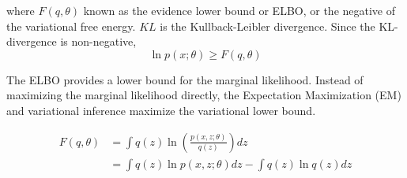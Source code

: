 \documentclass{article}
\begin{document}
where $F(q,\theta)$ known as the evidence lower bound or ELBO, or the negative of the variational free energy. $KL$ is the Kullback-Leibler divergence. Since the KL-divergence is non-negative,
\[ \ln p(x;\theta) \geq F(q,\theta) \]

The ELBO provides a lower bound for the marginal likelihood. Instead of maximizing the marginal likelihood directly, the Expectation Maximization (EM) and variational inference maximize the variational lower bound.

\begin{align}
F(q,\theta) &= \int q(z) \ln \left( \frac{p(x,z; \theta)}{q(z)} \right) dz \nonumber \\
&= \int q(z) \ln p(x,z; \theta)  dz - \int q(z) \ln q(z) dz  \nonumber 
\end{align}
\end{document}
